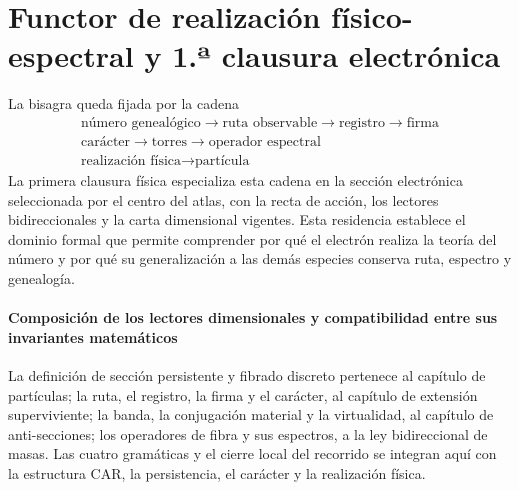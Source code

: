 \section{Functor de realización físico-espectral y 1.ª clausura electrónica}

La bisagra queda fijada por la cadena
\[
 \boxed{\begin{gathered}
 \text{número genealógico}
 \longrightarrow\text{ruta observable}
 \longrightarrow\text{registro}
 \longrightarrow\text{firma}
 \\
 \text{carácter}
 \longrightarrow\text{torres}
 \longrightarrow\text{operador espectral}
 \\
 \text{realización física}
 \longrightarrow\text{partícula}
 \end{gathered}}
\]
La primera clausura física especializa esta cadena en la sección electrónica
seleccionada por el centro del atlas, con la recta de acción, los lectores
bidireccionales y la carta dimensional vigentes. Esta residencia establece el
dominio formal que permite comprender por qué el electrón realiza la teoría
del número y por qué su generalización a las demás especies conserva ruta,
espectro y genealogía.

\paragraph{Composición de los lectores dimensionales y compatibilidad entre sus invariantes matemáticos}
La definición de sección persistente y fibrado discreto pertenece al capítulo
de partículas; la ruta, el registro, la firma y el carácter, al capítulo de
extensión superviviente; la banda, la conjugación material y la virtualidad,
al capítulo de anti-secciones; los operadores de fibra y sus espectros, a la
ley bidireccional de masas. Las cuatro gramáticas y el cierre local del
recorrido se integran aquí con la estructura CAR, la persistencia, el carácter
y la realización física.
